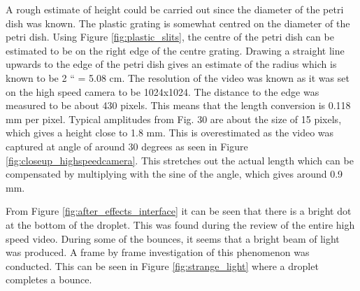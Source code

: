 A rough estimate of height could be carried out since the diameter of the petri dish was known. The plastic grating is somewhat centred on the diameter of the petri dish. Using Figure \ref{fig:plastic_slits}, the centre of the petri dish can be estimated to be on the right edge of the centre grating. Drawing a straight line upwards to the edge of the petri dish gives an estimate of the radius which is known to be 2 `` = 5.08 cm. The resolution of the video was known as it was set on the high speed camera to be 1024x1024. The distance to the edge was measured to be about 430 pixels. This means that the length conversion is 0.118 mm per pixel. Typical amplitudes from Fig. 30 are about the size of 15 pixels, which gives a height close to 1.8 mm. This is overestimated as the video was captured at angle of around 30 degrees as seen in Figure \ref{fig:closeup_highspeedcamera}. This stretches out the actual length which can be compensated by multiplying with the sine of the angle, which gives around 0.9 mm.  

From Figure \ref{fig:after_effects_interface} it can be seen that there is a bright dot at the bottom of the droplet. This was found during the review of the entire high speed video. During some of the bounces, it seems that a bright beam of light was produced. A frame by frame investigation of this phenomenon was conducted. This can be seen in Figure \ref{fig:strange_light} where a droplet completes a bounce.

